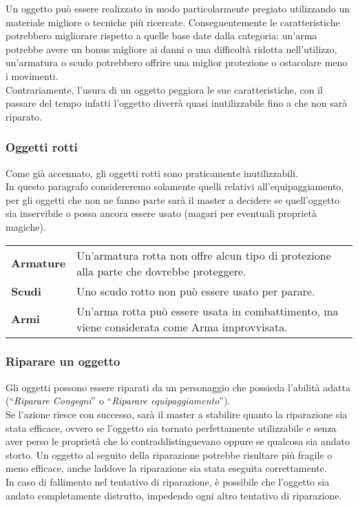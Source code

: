\documentclass[../manuale_main.tex]{subfiles}
\begin{document}
Un oggetto può essere realizzato in modo particolarmente pregiato utilizzando un materiale migliore o tecniche più ricercate. Conseguentemente le caratteristiche potrebbero migliorare rispetto a quelle base date dalla categoria: un'arma potrebbe avere un bonus migliore ai danni o una difficoltà ridotta nell'utilizzo, un'armatura o scudo potrebbero offrire una miglior protezione o ostacolare meno i movimenti.\\
Contrariamente, l'usura di un oggetto peggiora le sue caratteristiche, con il passare del tempo infatti l'oggetto diverrà quasi inutilizzabile fino a che non sarà riparato.

\subsubsection{Oggetti rotti}
Come già accennato, gli oggetti rotti sono praticamente inutilizzabili.\\
In questo paragrafo considereremo solamente quelli relativi all'equipaggiamento, per gli oggetti che non ne fanno parte sarà il master a decidere se quell'oggetto sia inservibile o possa ancora essere usato (magari per eventuali proprietà magiche).\\
\renewcommand{\arraystretch}{1.5}
\begin{tabularx}{\linewidth}{l X}
\textbf{Armature}&Un'armatura rotta non offre alcun tipo di protezione alla parte che dovrebbe proteggere.\\
\textbf{Scudi}&Uno scudo rotto non può essere usato per parare.\\
\textbf{Armi}&Un'arma rotta può essere usata in combattimento, ma viene considerata come Arma improvvisata.\\
\end{tabularx}

\subsubsection{Riparare un oggetto}
Gli oggetti possono essere riparati da un personaggio che possieda l'abilità adatta (``\emph{Riparare Congegni}'' o ``\emph{Riparare equipaggiamento}'').\\
Se l'azione riesce con successo, sarà il master a stabilire quanto la riparazione sia stata efficace, ovvero se l'oggetto sia tornato perfettamente utilizzabile e senza aver perso le proprietà che lo contraddistinguevano oppure se qualcosa sia andato storto. Un oggetto al seguito della riparazione potrebbe risultare più fragile o meno efficace, anche laddove la riparazione sia stata eseguita correttamente.\\
In caso di fallimento nel tentativo di riparazione, è possibile che l'oggetto sia andato completamente distrutto, impedendo ogni altro tentativo di riparazione.
\end{document}
